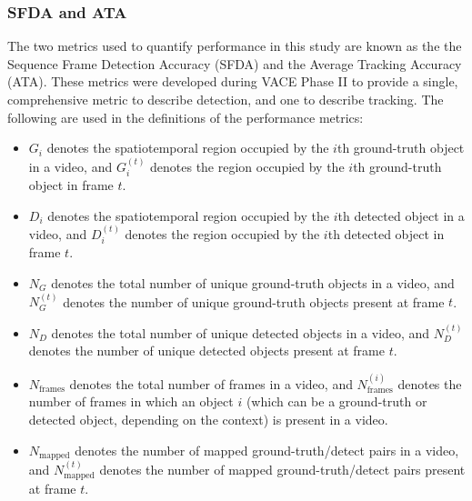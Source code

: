 \documentclass[smallcondensed, final]{svjour3}
\begin{document}



\subsubsection{SFDA and ATA}

The two metrics used to quantify performance in this study are known as the the Sequence Frame Detection Accuracy (SFDA) and the Average Tracking Accuracy (ATA). These metrics were developed during VACE Phase II to provide a single, comprehensive metric to describe detection, and one to describe tracking. The following are used in the definitions of the performance metrics:
\begin{itemize}
\renewcommand{\labelitemi}{$\bullet$}
\item $G_{i}$ denotes the spatiotemporal region occupied by the $i$th ground-truth object in a video, and $G_{i}^{(t)}$ denotes the region occupied by the $i$th ground-truth object in frame $t$.
\vspace{2mm}
\item $D_{i}$ denotes the spatiotemporal region occupied by the $i$th detected object in a video, and $D_{i}^{(t)}$ denotes the region occupied by the $i$th detected object in frame $t$.
\vspace{2mm}
\item $N_{G}$ denotes the total number of unique ground-truth objects in a video, and $N_{G}^{(t)}$ denotes the number of unique ground-truth objects present at frame $t$.
\vspace{2mm}
\item $N_{D}$ denotes the total number of unique detected objects in a video, and $N_{D}^{(t)}$ denotes the number of unique detected objects present at frame $t$.
\vspace{2mm}
\item $N_{\text{frames}}$ denotes the total number of frames in a video, and $N_{\text{frames}}^{(i)}$ denotes the number of frames in which an object $i$ (which can be a ground-truth or detected object, depending on the context) is present in a video.
\vspace{2mm}
\item $N_{\text{mapped}}$ denotes the number of mapped ground-truth/detect pairs in a video, and $N_{\text{mapped}}^{(t)}$ denotes the number of mapped ground-truth/detect pairs present at frame $t$.
\vspace{1mm}
\end{itemize}
\end{document}
